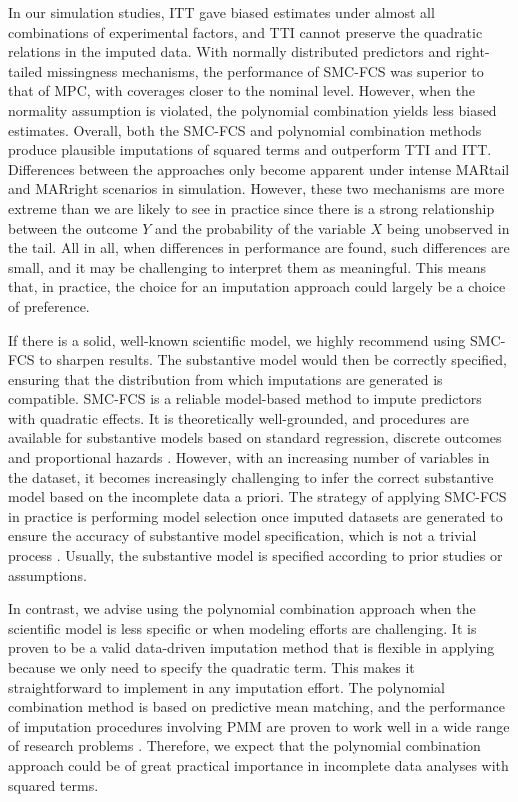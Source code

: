 	
	In our simulation studies, ITT gave biased estimates under almost all combinations of experimental factors, and TTI cannot preserve the quadratic relations in the imputed data. With normally distributed predictors and right-tailed missingness mechanisms, the performance of SMC-FCS was superior to that of MPC, with coverages closer to the nominal level. However, when the normality assumption is violated, the polynomial combination yields less biased estimates. Overall, both the SMC-FCS and polynomial combination methods produce plausible imputations of squared terms and outperform TTI and ITT. Differences between the approaches only become apparent under intense MARtail and MARright scenarios in simulation. However, these two mechanisms are more extreme than we are likely to see in practice since there is a strong relationship between the outcome $Y$ and the probability of the variable $X$ being unobserved in the tail. All in all, when differences in performance are found, such differences are small, and it may be challenging to interpret them as meaningful. This means that, in practice, the choice for an imputation approach could largely be a choice of preference. 
	
	If there is a solid, well-known scientific model, we highly recommend using SMC-FCS to sharpen results. The substantive model would then be correctly specified, ensuring that the distribution from which imputations are generated is compatible. SMC-FCS is a reliable model-based method to impute predictors with quadratic effects. It is theoretically well-grounded, and procedures are available for substantive models based on standard regression, discrete outcomes and proportional hazards \citep{Buuren2018}. However, with an increasing number of variables in the dataset, it becomes increasingly challenging to infer the correct substantive model based on the incomplete data a priori. The strategy of applying SMC-FCS in practice is performing model selection once imputed datasets are generated to ensure the accuracy of substantive model specification, which is not a trivial process \citep{bartlett2015multiple}. Usually, the substantive model is specified according to prior studies or assumptions.      
	
	In contrast, we advise using the polynomial combination approach when the scientific model is less specific or when modeling efforts are challenging. It is proven to be a valid data-driven imputation method that is flexible in applying because we only need to specify the quadratic term. This makes it straightforward to implement in any imputation effort. The polynomial combination method is based on predictive mean matching, and the performance of imputation procedures involving PMM are proven to work well in a wide range of research problems \citep{Vink2015, rubin1986statistical, little1988missing}. Therefore, we expect that the polynomial combination approach could be of great practical importance in incomplete data analyses with squared terms.  
	
